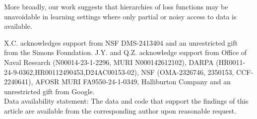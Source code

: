 \documentclass[aps,prx,reprint,superscriptaddress,amsmath,amssymb,longbibliography,floatfix]{revtex4-2}
\newcommand{\XC}[1]{{\textcolor{purple}{#1}}}
\theoremstyle{plain}
\theoremstyle{definition}
\theoremstyle{remark}
\begin{document}



More broadly, our work suggests that hierarchies of loss functions may be unavoidable in learning settings where only partial or noisy access to data is available.

\begin{acknowledgments}
X.C. acknowledges support from NSF DMS-2413404 and an unrestricted gift from the Simons Foundation. J.Y. and Q.Z. acknowledge support from Office of Naval Research (N00014-23-1-2296, MURI N000142612102), DARPA (HR0011-24-9-0362,HR00112490453,D24AC00153-02), NSF (OMA-2326746, 2350153, CCF-2240641), AFOSR MURI FA9550-24-1-0349, Halliburton Company and an unrestricted gift from Google.
\\

Data availability statement: 
The data and code that support the findings of this article are available from the corresponding author upon reasonable request.
\end{acknowledgments}







\end{document}
